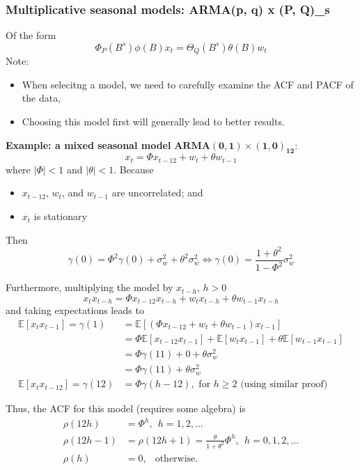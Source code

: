 \documentclass[11pt]{article}
\newcommand{\noi}{\noindent}
\begin{document}
\subsubsection{Multiplicative seasonal models: ARMA(p, q) x (P, Q)_s}
\noi Of the form
$$\Phi_P(B^s)\phi(B)x_t = \Theta_Q(B^s)\theta(B)w_t$$
\noi Note:
\begin{itemize}
    \item When selecitng a model, we need to carefully examine the ACF and PACF of the data,
    \item Choosing this model first will generally lead to better results.
\end{itemize} \phantom{i}

\noi \textbf{Example: a mixed seasonal model} $\boldsymbol{ARMA(0, 1) \times (1, 0)_{12}}$:
$$x_t = \Phi x_{t-12} + w_t + \theta w_{t-1}$$
\noi where $|\Phi| < 1$ and $|\theta| < 1$. Because
\begin{itemize}
    \item $x_{t-12}$, $w_t$, and $w_{t-1}$ are uncorrelated; and
    \item $x_t$ is stationary
\end{itemize} \phantom{i}

\noi Then
$$\gamma(0) = \Phi^2\gamma(0) + \sigma_w^2 + \theta^2\sigma_w^2 \Leftrightarrow \gamma(0) = \frac{1 + \theta^2}{1 - \Phi^2}\sigma_w^2$$

\noi Furthermore, multiplying the model by $x_{t-h}$, $h > 0$
$$x_t x_{t-h} = \Phi x_{t-12}x_{t-h} + w_tx_{t-h} + \theta w_{t-1}x_{t-h}$$
\noi and taking expectations leads to
\begin{align*}
    \mathbb{E}[x_tx_{t-1}] = \gamma(1) &= \mathbb{E}[(\Phi x_{t-12} + w_{t} + \theta w_{t-1})x_{t-1}] \\
    &= \Phi \mathbb{E}[x_{t-12}x_{t-1}] + \mathbb{E}[w_t x_{t-1}] + \theta \mathbb{E}[w_{t-1}x_{t-1}] \\
    &= \Phi\gamma(11) + 0 + \theta\sigma_w^2 \\
    &= \Phi\gamma(11) + \theta \sigma_w^2 \\
    \mathbb{E}[x_t x_{t-12}] = \gamma(12) &= \Phi \gamma(h-12), \text{ for } h \geq 2 \text{ (using similar proof)}
\end{align*}

\noi Thus, the ACF for this model (requires some algebra) is
\begin{align*}
    \rho(12h) &= \Phi^h, \: \: h=1,2,... \\
    \rho(12h-1) &= \rho(12h+1) = \frac{\theta}{1 + \theta^2}\Phi^h, \: \: h=0,1,2,... \\
    \rho(h) &= 0, \: \: \text{ otherwise}.
\end{align*}
\end{document}
